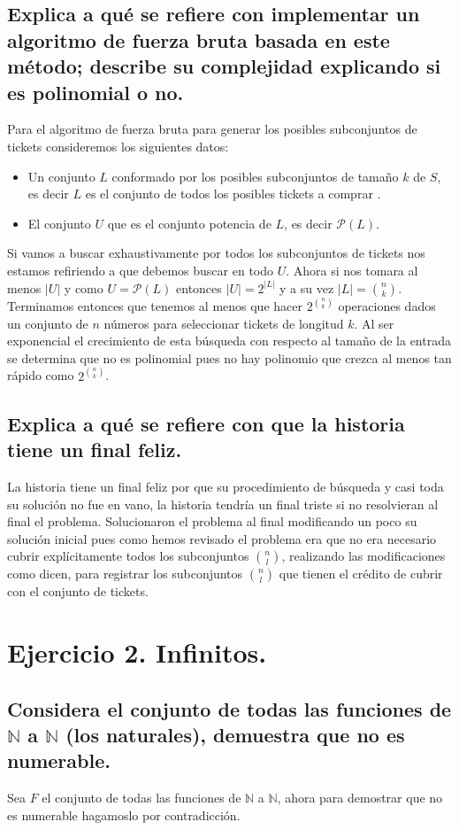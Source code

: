 \documentclass[12pt]{article}
\begin{document}
\subsection{Explica a qué se refiere con implementar un algoritmo de fuerza bruta basada en este método; describe su complejidad explicando si es polinomial o no.}
Para el algoritmo de fuerza bruta para generar los posibles subconjuntos de tickets consideremos los siguientes datos:
\begin{itemize}
	\item Un conjunto $L$ conformado por los posibles subconjuntos de tamaño $k$ de $S$, es decir $L$ es el conjunto de todos los posibles tickets a comprar .
	\item El conjunto $U$ que es el conjunto potencia de $L$, es decir $\mathcal{P}(L)$.
\end{itemize}
Si vamos a buscar exhaustivamente por todos los subconjuntos de tickets nos estamos refiriendo a que debemos buscar en todo $U$.
Ahora si nos tomara al menos $|U|$ y como $U=\mathcal{P}(L)$ entonces $|U|=2^{|L|}$ y a su vez $|L|= {{n}\choose{k}}$.
Terminamos entonces que tenemos al menos que hacer $2^{{n}\choose{k}}$ operaciones dados un conjunto de $n$ números para seleccionar tickets de longitud $k$. Al ser exponencial el crecimiento de esta búsqueda con respecto al tamaño de la entrada se determina que no es polinomial pues no hay polinomio que crezca al menos tan rápido como $2^{{n}\choose{k}}$.
 \subsection{Explica a qué se refiere con que la historia tiene un final feliz.}
 La historia tiene un final feliz por que su procedimiento de búsqueda y casi toda su solución no fue en vano, la historia tendría un final triste si no resolvieran al final el problema. Solucionaron el problema al final modificando un poco su solución inicial pues como hemos revisado el problema era que no era necesario cubrir explícitamente todos los subconjuntos ${n}\choose{l}$, realizando las modificaciones como dicen, para registrar los subconjuntos ${n}\choose{l}$  que tienen  el crédito de cubrir con el conjunto de tickets.
\section{Ejercicio 2. Infinitos.}
\subsection{Considera el conjunto de todas las funciones de $\mathbb{N}$ a $\mathbb{N}$ (los naturales), demuestra que no es numerable.}
Sea $F$ el conjunto de todas las funciones de $\mathbb{N}$ a $\mathbb{N}$, ahora para demostrar que no es numerable hagamoslo por contradicción.
\end{document}
